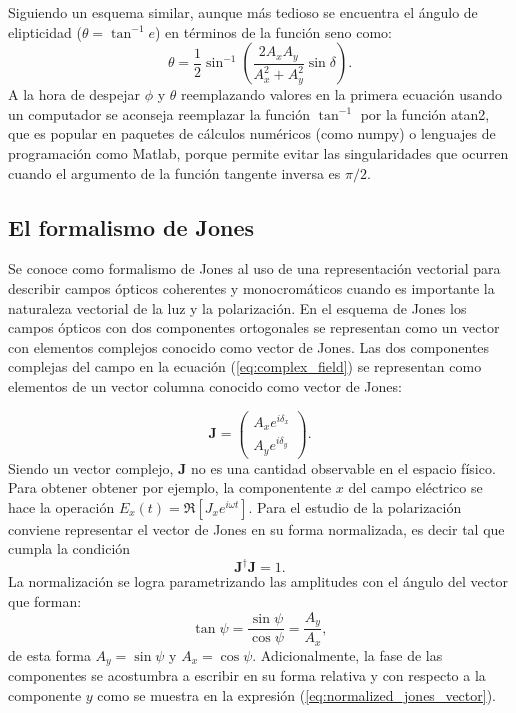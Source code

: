 Siguiendo un esquema similar, aunque más tedioso se encuentra el
ángulo de elipticidad ($\theta = \tan^{-1}{e}$) en términos de la
función seno como:
\begin{equation*}
\theta = \frac{1}{2}\sin^{-1}{\left(\frac{2A_xA_y}{A_x^2+A_y^2}\sin{\delta}\right)}.
\end{equation*}
A la hora de despejar $\phi$ y $\theta$ reemplazando valores en la
primera ecuación usando un computador se aconseja reemplazar la función
$\tan^{-1}$ por la función atan2, que es popular en paquetes de
cálculos numéricos (como numpy) o lenguajes de programación como
Matlab, porque permite evitar las singularidades que ocurren cuando el argumento de la
función tangente inversa es $\pi/2$.

\subsection{El formalismo de Jones}

Se conoce como formalismo de Jones al uso de una representación
vectorial para describir campos ópticos coherentes y monocromáticos cuando es
importante la naturaleza vectorial de la luz y la polarización.  
En el esquema de Jones los campos ópticos con dos componentes ortogonales se
representan como un vector con elementos complejos conocido como
vector de Jones. Las dos componentes complejas del campo en la ecuación
(\ref{eq:complex_field}) se representan como elementos de un vector
columna conocido como vector de Jones:
 
\begin{equation}
\mathbf{J} =\begin{pmatrix} A_xe^{i\delta_x}\\A_ye^{i\delta_y}\end{pmatrix}.
\label{eq:jones_vector}
\end{equation}
Siendo un vector complejo, $\mathbf{J}$ no es una cantidad observable
en el espacio físico. Para obtener obtener por ejemplo, la
componentente  $x$ del campo eléctrico se hace la operación $E_x(t) = \Re
\left[J_xe^{i\omega t}\right]$.
Para el estudio de la polarización conviene representar el vector de
Jones en su forma normalizada, es decir tal que cumpla la condición $$\mathbf{J}^{\dagger}\mathbf{J}=1.$$
La normalización se logra parametrizando las amplitudes con el ángulo
del vector que forman: $$\tan{\psi}=\frac{\sin{\psi}}{\cos{\psi}}=\frac{A_y}{A_x},$$
de esta forma $A_y=\sin{\psi}$ y $A_x = \cos{\psi}$. Adicionalmente,
la fase de las componentes se acostumbra a escribir en su forma
relativa y con respecto a la componente $y$ como se muestra en la
expresión (\ref{eq:normalized_jones_vector}).

